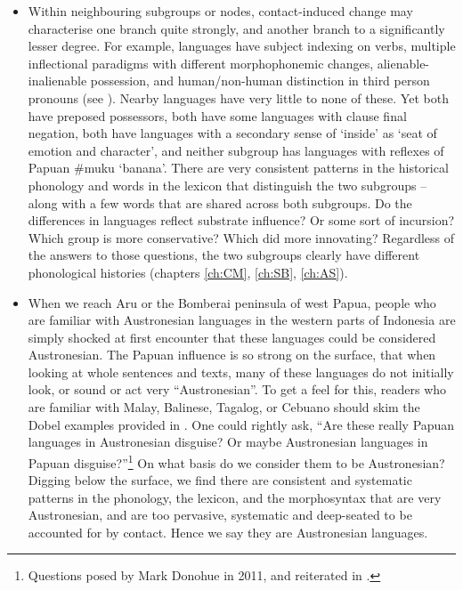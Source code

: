 \begin{itemize}
\item	Within neighbouring subgroups or nodes,
			contact-induced change may characterise one branch quite strongly,
			and another branch to a significantly lesser degree.
			For example,  languages have subject indexing
			on verbs, multiple inflectional paradigms with different morphophonemic
			changes, alienable-inalienable possession, and human/non-human distinction
			in third person pronouns (see ).
			Nearby  languages have very little to none of these.
			Yet both have preposed possessors,
			both have some languages with clause final negation,
			both have languages with a secondary sense of ‘inside’ as ‘seat
			of emotion and character’, and neither subgroup has languages with reflexes
			of Papuan {\#}muku ‘banana’.
			There are very consistent patterns in the historical phonology
			and words in the lexicon that distinguish the two subgroups -- along
			with a few words that are shared across both subgroups.
			Do the differences in  languages reflect substrate
			influence? Or some sort of incursion? Which group is more conservative?
			Which did more innovating? Regardless of the answers to those
			questions, the two subgroups clearly have different phonological
			histories (chapters \ref{ch:CM}, \ref{ch:SB}, \ref{ch:AS}).
\item	When we reach Aru or the Bomberai peninsula of west Papua,
			people who are familiar with Austronesian languages in the western
			parts of Indonesia are simply shocked at first encounter that
			these languages could be considered Austronesian.
			The Papuan influence is so strong on the surface,
			that when looking at whole sentences
			and texts, many of these languages do not initially look,
			or sound or act very “Austronesian”.
			To get a feel for this,
			readers who are familiar with Malay,
			Balinese, Tagalog, or Cebuano should skim the Dobel examples provided in \citet{Hughes2000}.
			One could rightly ask,
			“Are these really Papuan languages in Austronesian disguise?
			Or maybe Austronesian languages in Papuan disguise?”\footnote{
					Questions
					posed by Mark Donohue in 2011,
					and reiterated in \citet{DonohueDenham2020}.}
			On what basis
			do we consider them to be Austronesian? Digging below the surface,
			we find there are consistent
			and systematic patterns in the phonology,
			the lexicon, and the morphosyntax that are very Austronesian,
			and are too pervasive,
			systematic and deep-seated to be accounted for by contact.
			Hence we say they are Austronesian languages.

\end{itemize}

